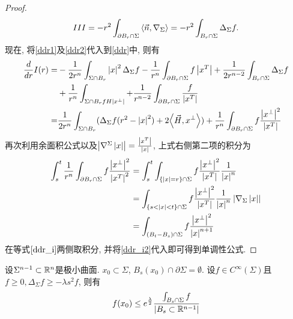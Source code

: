 \begin{proof}
\begin{equation}
        III=-r^2\int_{\partial B_r\cap \Sigma} {\left < \vec{n}, \nabla_\Sigma \right >} =-r^2\int_{{B_r} \cap \Sigma} \Delta_{\Sigma}f.
     \end{equation}
     现在, 将\eqref{ddr1}及\eqref{ddr2}代入到\eqref{ddr}中, 则有
     \begin{equation}\label{ddr_i}
        \begin{split}
            \frac{d}{dr} I(r) =& -\frac{1}{2r^n}\int_{\Sigma \cap B_r}\left | x \right |^2 \Delta_\Sigma f - \frac{1}{r^n} \int_{\partial B_r\cap \Sigma} f \left | x^T \right | + \frac{1}{2r^{n-2}} \int_{B_r\cap \Sigma} \Delta_\Sigma f \\
            &+ \frac{1}{r^n} \int_{\Sigma \cap B_r fH\left | x^\perp \right |} + \frac{1}{r^{n-2}} \int_{\partial B_r \cap \Sigma} \frac{f}{\left | x^T \right |} \\
            =& \frac{1}{2r^n} \int_{\Sigma \cap B_r}(\Delta_\Sigma f(r^2-\left | x \right |^2) + 2{\left < \vec{H}, x^\perp \right >}) + \frac{1}{r^n}\int_{\partial B_r\cap \Sigma} f \frac{\left | x^\perp \right |^2}{\left | x^T \right |}
        \end{split}
     \end{equation}
     再次利用余面积公式以及$\left | \nabla^\Sigma\left | x \right | \right |=\frac{\left | x^T \right |}{\left | x \right |}$, 上式右侧第二项的积分为
     \begin{equation} \label{ddr_i2}
        \begin{split}
            \int^t_s \frac{1}{r^n} \int_{\partial B_r \cap \Sigma} f \frac{\left | x^\perp \right |^2}{\left | x^T \right |^2} &= \int^t_s \int_{\{\left | x \right | = r\}\cap \Sigma} f  \frac{\left | x^\perp \right |^2}{\left | x^T \right |} \frac{1}{\left | x \right |^n} \\
            &= \int_{\{s<\left | x \right |<t\}\cap \Sigma } f \frac{\left | x^\perp \right |^2}{\left | x^T \right |}\frac{1}{\left | x \right |^n}\left | \nabla_\Sigma\left | x \right | \right | \\
            &=\int_{(B_t-B_s)\cap \Sigma} f \frac{\left | x^\perp \right |^2}{\left | x \right |^{n+1}}
        \end{split}
     \end{equation}
     在等式$\eqref{ddr_i}$两侧取积分, 并将\eqref{ddr_i2}代入即可得到单调性公式.
\end{proof}
\begin{corollary}
    设$\Sigma^{n-1} \subset \mathbb{R}^n$是极小曲面. $x_0 \subset \Sigma$, $B_s(x_0) \cap \partial \Sigma = \emptyset$. 设$f \in C^\infty(\Sigma)$且 $f \ge 0, \Delta_{\Sigma}f \ge -\lambda s^2 f$, 则有
    \begin{equation}
        f(x_0) \le e^{\frac{\lambda}{2}}\frac{\int_{B_s\cap \Sigma}f}{\left | B_s\subset \mathbb{R}^{n-1} \right |}
    \end{equation}
\end{corollary}
